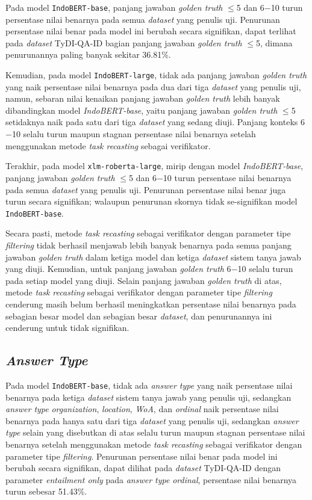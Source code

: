 Pada model \texttt{IndoBERT-base}, panjang jawaban \emph{golden truth} $\leq$5 dan 6$-$10 turun persentase nilai benarnya pada semua \emph{dataset} yang penulis uji. Penurunan persentase nilai benar pada model ini berubah secara signifikan, dapat terlihat pada \emph{dataset} TyDI-QA-ID bagian panjang jawaban \emph{golden truth} $\leq$5, dimana penurunannya paling banyak sekitar 36.81\%.

Kemudian, pada model \texttt{IndoBERT-large}, tidak ada panjang jawaban \emph{golden truth} yang naik persentase nilai benarnya pada dua dari tiga \emph{dataset} yang penulis uji, namun, sebaran nilai kenaikan panjang jawaban \emph{golden truth} lebih banyak dibandingkan model \emph{IndoBERT-base}, yaitu panjang jawaban \emph{golden truth}  $\leq$5 setidaknya naik pada satu dari tiga \emph{dataset} yang sedang diuji. Panjang konteks  6$-$10 selalu turun maupun stagnan persentase nilai benarnya setelah menggunakan metode \emph{task recasting} sebagai verifikator.

Terakhir, pada model \texttt{xlm-roberta-large}, mirip dengan model \emph{IndoBERT-base}, panjang jawaban \emph{golden truth} $\leq$5 dan 6$-$10 turun persentase nilai benarnya pada semua \emph{dataset} yang penulis uji. Penurunan persentase nilai benar juga turun secara signifikan; walaupun penurunan skornya tidak se-signifikan model \texttt{IndoBERT-base}.

Secara pasti, metode \emph{task recasting} sebagai verifikator dengan parameter tipe \emph{filtering} tidak berhasil menjawab lebih banyak benarnya pada semua panjang jawaban \emph{golden truth} dalam ketiga model dan ketiga \emph{dataset} sistem tanya jawab yang diuji. Kemudian, untuk panjang jawaban \emph{golden truth} 6$-$10 selalu turun pada setiap model yang diuji. Selain panjang jawaban \emph{golden truth} di atas, metode \emph{task recasting} sebagai verifikator dengan parameter tipe \emph{filtering} cenderung masih belum berhasil meningkatkan persentase nilai benarnya pada sebagian besar model dan sebagian besar \emph{dataset}, dan penurunannya ini cenderung untuk tidak signifikan.

\subsection{\emph{Answer Type}}
Pada model \texttt{IndoBERT-base}, tidak ada \emph{answer type} yang naik persentase nilai benarnya pada ketiga \emph{dataset} sistem tanya jawab yang penulis uji, sedangkan \emph{answer type} \emph{organization}, \emph{location}, \emph{WoA}, dan \emph{ordinal} naik persentase nilai benarnya pada hanya satu dari tiga \emph{dataset} yang penulis uji, sedangkan \emph{answer type} selain yang disebutkan di atas selalu turun maupun stagnan persentase nilai benarnya setelah menggunakan metode \emph{task recasting} sebagai verifikator dengan parameter tipe \emph{filtering}. Penurunan persentase nilai benar pada model ini berubah secara signifikan, dapat dilihat pada \emph{dataset} TyDI-QA-ID dengan parameter \emph{entailment only} pada \emph{answer type} \emph{ordinal}, persentase nilai benarnya turun sebesar 51.43\%.

